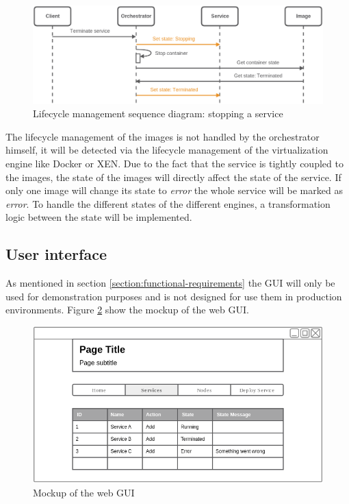 \begin{figure}[H]
    \centering
    \includegraphics[width=\textwidth]{resources/images/lifecycle_sequence_diagram_stop_service.png}
    \caption[Lifecycle management sequence diagram: stopping a service]{Lifecycle management sequence diagram: stopping a service}
    \label{fig:lifecycle_mgm_squence_diagram_stop_service}
\end{figure}

The lifecycle management of the images is not handled by the orchestrator himself, it will be detected via the lifecycle management of the virtualization engine like Docker or XEN.
Due to the fact that the service is tightly coupled to the images, the state of the images will directly affect the state of the service.
If only one image will change its state to \textit{error} the whole service will be marked as \textit{error}.
To handle the different states of the different engines, a transformation logic between the state will be implemented.


\subsection{User interface}
As mentioned in section \ref{section:functional-requirements} the \ac{GUI} will only be used for demonstration purposes and is not designed for use them in production environments.
Figure \ref{fig:gui_mockup} show the mockup of the web \ac{GUI}.

\begin{figure}[H]
    \centering
    \includegraphics[width=\textwidth]{resources/images/gui_prototype.png}
    \caption[Mockup of the web \ac{GUI}]{Mockup of the web \ac{GUI}}
    \label{fig:gui_mockup}
\end{figure}

